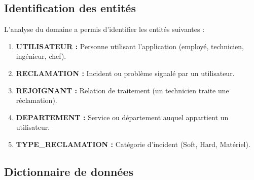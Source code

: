 \documentclass[12pt,a4paper,oneside]{report}
\begin{document}
\subsection{Identification des entités}

L'analyse du domaine a permis d'identifier les entités suivantes :

\begin{enumerate}
    \item \textbf{UTILISATEUR :} Personne utilisant l'application (employé, technicien, ingénieur, chef).
    \item \textbf{RECLAMATION :} Incident ou problème signalé par un utilisateur.
    \item \textbf{REJOIGNANT :} Relation de traitement (un technicien traite une réclamation).
    \item \textbf{DEPARTEMENT :} Service ou département auquel appartient un utilisateur.
    \item \textbf{TYPE\_RECLAMATION :} Catégorie d'incident (Soft, Hard, Matériel).
\end{enumerate}

\subsection{Dictionnaire de données}
\end{document}
